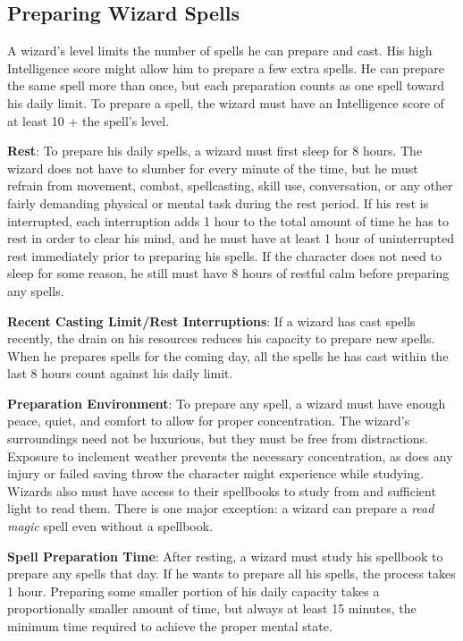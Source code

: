 \subsection{Preparing Wizard Spells}

				
A wizard's level limits the number of spells he can prepare and cast. His high Intelligence score might allow him to prepare a few extra spells. He can prepare the same spell more than once, but each preparation counts as one spell toward his daily limit. To prepare a spell, the wizard must have an Intelligence score of at least 10 + the spell's level.
				
\textbf{Rest}: To prepare his daily spells, a wizard must first sleep for 8 hours. The wizard does not have to slumber for every minute of the time, but he must refrain from movement, combat, spellcasting, skill use, conversation, or any other fairly demanding physical or mental task during the rest period. If his rest is interrupted, each interruption adds 1 hour to the total amount of time he has to rest in order to clear his mind, and he must have at least 1 hour of uninterrupted rest immediately prior to preparing his spells. If the character does not need to sleep for some reason, he still must have 8 hours of restful calm before preparing any spells. 
				
\textbf{Recent Casting Limit/Rest Interruptions}: If a wizard has cast spells recently, the drain on his resources reduces his capacity to prepare new spells. When he prepares spells for the coming day, all the spells he has cast within the last 8 hours count against his daily limit.
				
\textbf{Preparation Environment}: To prepare any spell, a wizard must have enough peace, quiet, and comfort to allow for proper concentration. The wizard's surroundings need not be luxurious, but they must be free from distractions. Exposure to inclement weather prevents the necessary concentration, as does any injury or failed saving throw the character might experience while studying. Wizards also must have access to their spellbooks to study from and sufficient light to read them. There is one major exception: a wizard can prepare a \textit{read magic }spell even without a spellbook. 
				
\textbf{Spell Preparation Time}: After resting, a wizard must study his spellbook to prepare any spells that day. If he wants to prepare all his spells, the process takes 1 hour. Preparing some smaller portion of his daily capacity takes a proportionally smaller amount of time, but always at least 15 minutes, the minimum time required to achieve the proper mental state.
				
